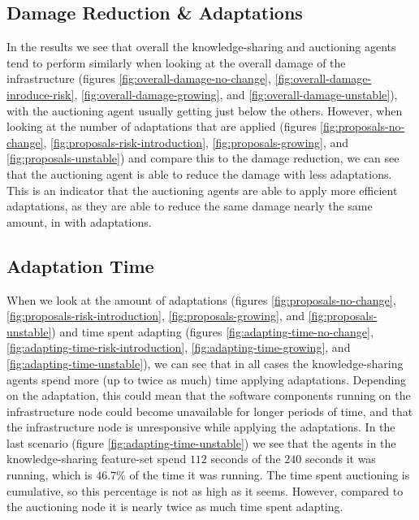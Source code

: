 \subsection{Damage Reduction \& Adaptations}
\label{ssec:efficient-adaptations}
In the results we see that overall the knowledge-sharing and auctioning agents tend to perform similarly when looking at the overall damage of the infrastructure (figures \ref{fig:overall-damage-no-change}, \ref{fig:overall-damage-inroduce-risk}, \ref{fig:overall-damage-growing}, and \ref{fig:overall-damage-unstable}), with the auctioning agent usually getting just below the others. However, when looking at the number of adaptations that are applied (figures \ref{fig:proposals-no-change}, \ref{fig:proposals-risk-introduction}, \ref{fig:proposals-growing}, and \ref{fig:proposals-unstable}) and compare this to the damage reduction, we can see that the auctioning agent is able to reduce the damage with less adaptations. This is an indicator that the auctioning agents are able to apply more efficient adaptations, as they are able to reduce the same damage nearly the same amount, in with adaptations.

\subsection{Adaptation Time}
\label{ssec:adaptation-time}
When we look at the amount of adaptations (figures \ref{fig:proposals-no-change}, \ref{fig:proposals-risk-introduction}, \ref{fig:proposals-growing}, and \ref{fig:proposals-unstable}) and time spent adapting (figures \ref{fig:adapting-time-no-change}, \ref{fig:adapting-time-risk-introduction}, \ref{fig:adapting-time-growing}, and \ref{fig:adapting-time-unstable}), we can see that in all cases the knowledge-sharing agents spend more (up to twice as much) time applying adaptations.
Depending on the adaptation, this could mean that the software components running on the infrastructure node could become unavailable for longer periods of time, and that the infrastructure node is unresponsive while applying the adaptations.  In the last scenario (figure \ref{fig:adapting-time-unstable}) we see that the agents in the knowledge-sharing feature-set spend $112$ seconds of the $240$ seconds it was running, which is $46.7\%$ of the time it was running. The time spent auctioning is cumulative, so this percentage is not as high as it seems. However, compared to the auctioning node it is nearly twice as much time spent adapting.

